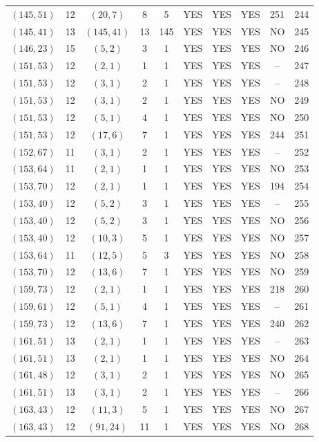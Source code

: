 \begin{longtable}{|c|c|c|c|c|c|c|c|c|c|}
$(145, 51)$ & 12 & $(20, 7)$ & 8 & 5 & YES & YES & YES & 251 & 244\\
$(145, 41)$ & 13 & $(145, 41)$ & 13 & 145 & YES & YES & YES & NO & 245\\
$(146, 23)$ & 15 & $(5, 2)$ & 3 & 1 & YES & YES & YES & NO & 246\\
$(151, 53)$ & 12 & $(2, 1)$ & 1 & 1 & YES & YES & YES & -- & 247\\
$(151, 53)$ & 12 & $(3, 1)$ & 2 & 1 & YES & YES & YES & -- & 248\\
$(151, 53)$ & 12 & $(3, 1)$ & 2 & 1 & YES & YES & YES & NO & 249\\
$(151, 53)$ & 12 & $(5, 1)$ & 4 & 1 & YES & YES & YES & NO & 250\\
$(151, 53)$ & 12 & $(17, 6)$ & 7 & 1 & YES & YES & YES & 244 & 251\\
$(152, 67)$ & 11 & $(3, 1)$ & 2 & 1 & YES & YES & YES & -- & 252\\
$(153, 64)$ & 11 & $(2, 1)$ & 1 & 1 & YES & YES & YES & NO & 253\\
$(153, 70)$ & 12 & $(2, 1)$ & 1 & 1 & YES & YES & YES & 194 & 254\\
$(153, 40)$ & 12 & $(5, 2)$ & 3 & 1 & YES & YES & YES & -- & 255\\
$(153, 40)$ & 12 & $(5, 2)$ & 3 & 1 & YES & YES & YES & NO & 256\\
$(153, 40)$ & 12 & $(10, 3)$ & 5 & 1 & YES & YES & YES & NO & 257\\
$(153, 64)$ & 11 & $(12, 5)$ & 5 & 3 & YES & YES & YES & NO & 258\\
$(153, 70)$ & 12 & $(13, 6)$ & 7 & 1 & YES & YES & YES & NO & 259\\
$(159, 73)$ & 12 & $(2, 1)$ & 1 & 1 & YES & YES & YES & 218 & 260\\
$(159, 61)$ & 12 & $(5, 1)$ & 4 & 1 & YES & YES & YES & -- & 261\\
$(159, 73)$ & 12 & $(13, 6)$ & 7 & 1 & YES & YES & YES & 240 & 262\\
$(161, 51)$ & 13 & $(2, 1)$ & 1 & 1 & YES & YES & YES & -- & 263\\
$(161, 51)$ & 13 & $(2, 1)$ & 1 & 1 & YES & YES & YES & NO & 264\\
$(161, 48)$ & 12 & $(3, 1)$ & 2 & 1 & YES & YES & YES & NO & 265\\
$(161, 51)$ & 13 & $(3, 1)$ & 2 & 1 & YES & YES & YES & -- & 266\\
$(163, 43)$ & 12 & $(11, 3)$ & 5 & 1 & YES & YES & YES & NO & 267\\
$(163, 43)$ & 12 & $(91, 24)$ & 11 & 1 & YES & YES & YES & NO & 268\\

\end{longtable}
